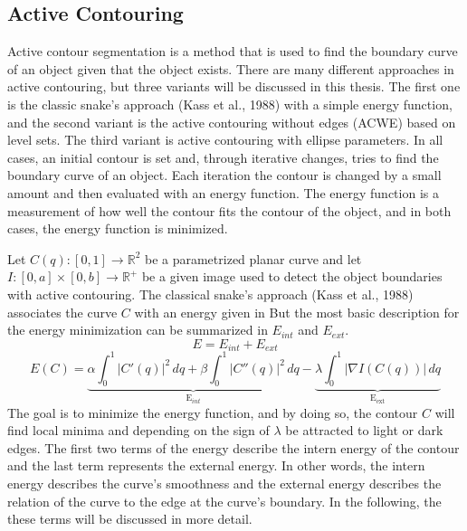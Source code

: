 \subsection{Active Contouring }
Active contour \cite{vondracek_image_2018} segmentation is a method that is used to find the boundary curve of an object given that the object exists. There are many different approaches in active contouring, but three variants will be discussed in this thesis. The first one is the classic snake's approach (Kass et al., 1988) \cite{kass_snakes_1988} with a simple energy function, and the second variant is the active contouring without edges (ACWE)  based on level sets. The third variant is active contouring with ellipse parameters. In all cases, an initial contour is set and, through iterative changes, tries to find the boundary curve of an object. Each iteration the contour is changed by a small amount and then evaluated with an energy function. The energy function is a measurement of how well the contour fits the contour of the object, and in both cases, the energy function is minimized.

Let $C(q): [0, 1] \rightarrow \mathbb{R}^2$ be a parametrized planar curve and let $I : [0, a] \times [0, b] \rightarrow \mathbb{R}^+$ be a given image used to detect the object boundaries with active contouring. The classical snake's approach (Kass et al., 1988) \cite{kass_snakes_1988} associates the curve $C$ with an energy given in 
But the most basic description for the energy minimization can be summarized in $E_{int}$ and $E_{ext}$. 
\begin{equation}
    E = E_{int} + E_{ext}
    \label{energy}
\end{equation}
\begin{equation}
        E(C) = \underbrace{\alpha \int_0^1 |C'(q)|^2 \, dq + \beta \int_0^1 |C''(q)|^2 \, dq}_{\text{E}_{int}} - \underbrace{\lambda \int_0^1 |\nabla I (C(q))| \, dq}_{\text{E}_{\text{ext}}}
\label{acgd}
\end{equation}
The goal is to minimize the energy function, and by doing so, the contour $C$ will find local minima and depending on the sign of $\lambda$ be attracted to light or dark edges. The first two terms of the energy describe the intern energy of the contour and the last term represents the external energy. In other words, the intern energy describes the curve's smoothness and the external energy describes the relation of the curve to the edge at the curve's boundary. In the following, the these terms will be discussed in more detail.

